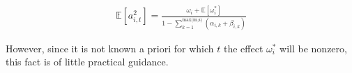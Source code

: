 \documentclass[11pt]{article}
\newcommand{\x}{\textbf{x}}
\def\mbf#1{\mathbf{#1}} %
\def\mc#1{\mathcal{#1}} %
\def\mc#1{\mathcal{#1}}
\theoremstyle{definition}
\begin{document}
\begin{align*} 
\mathbb{E}[a^{2}_{i,t}] = \frac{\omega_{i} + \mathbb{E}[\omega_{i}^{*}] }{1 - \sum^{\text{max(m,s)}}_{k=1}(\alpha_{i,k}+\beta_{i,k})}
\end{align*} 

However, since it is not known a priori for which $t$ the effect $\omega_{i}^{*}$ will be nonzero, this fact is of little practical guidance.

\end{document}
